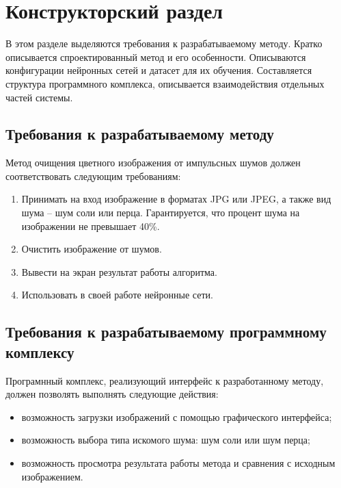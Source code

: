 \section{Конструкторский раздел}
В этом разделе выделяются требования к разрабатываемому методу.
Кратко описывается спроектированный метод и его особенности.
Описываются конфигурации нейронных сетей и датасет для их обучения.
Составляется структура программного комплекса, описывается взаимодействия отдельных частей системы. 

\subsection{Требования к разрабатываемому методу}
Метод очищения цветного изображения от импульсных шумов должен соответствовать следующим требованиям:
\begin{enumerate}
	\item Принимать на вход изображение в форматах JPG или JPEG, а также вид шума -- шум соли или перца. 
	Гарантируется, что процент шума на изображении не превышает 40\%.
	\item Очистить изображение от шумов.
	\item Вывести на экран результат работы алгоритма.
	\item Использовать в своей работе нейронные сети.
\end{enumerate}

\subsection{Требования к разрабатываемому программному комплексу}
Програмнный комплекс, реализующий интерфейс к разработанному методу, должен позволять выполнять следующие действия:
\begin{itemize}
	\item возможность загрузки изображений с помощью графического интерфейса;
	\item возможность выбора типа искомого шума: шум соли или шум перца;
	\item возможность просмотра результата работы метода и сравнения с исходным изображением.
\end{itemize}

